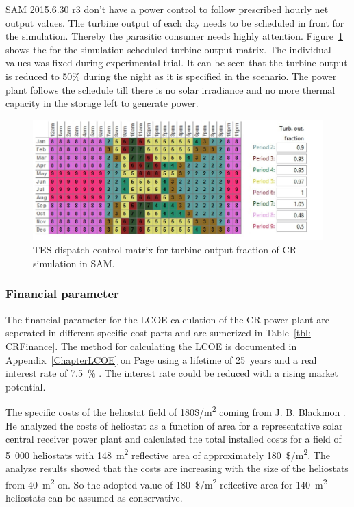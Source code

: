 SAM 2015.6.30 r3 don't have a power control to follow prescribed hourly net output values. The turbine output of each day needs to be scheduled in front for the simulation. Thereby the parasitic consumer needs highly attention. Figure~\ref{CR_turbineoutput} shows the for the simulation scheduled turbine output matrix. The individual values was fixed during experimental trial. It can be seen that the turbine output is reduced to 50\% during the night as it is specified in the scenario. The power plant follows the schedule till there is no solar irradiance and no more thermal capacity in the storage left to generate power. 
\begin{figure}[htbp]  
\centering
\includegraphics[width=0.95\linewidth]{FIG/CR_turbineoutput}
\caption[TES dispatch control matrix for turbine output fraction of CR simulation in SAM.]{TES dispatch control matrix for turbine output fraction of CR simulation in SAM.}\label{CR_turbineoutput}
\end{figure}
\pagebreak
\subsubsection{Financial parameter}
The financial parameter for the LCOE calculation of the CR power plant are seperated in different specific cost parts and are sumerized in Table~\ref{tbl: CRFinance}. The method for calculating the LCOE is documented in Appendix~\ref{ChapterLCOE} on Page \pageref{ChapterLCOE} using a lifetime of 25~years and a real interest rate of 7.5~\% \cite{FraunhoferISE2013}. The interest rate could be reduced with a rising market potential.



The specific costs of the heliostat field of 180\$/m\textsuperscript{2} coming from J. B. Blackmon \cite{Blackmon2012}. He analyzed the costs of heliostat as a function of area for a representative solar central receiver power plant and calculated the total installed costs for a field of 5~000 heliostats with 148~m\textsuperscript{2} reflective area of approximately 180~\$/m\textsuperscript{2}. The analyze results showed that the costs are increasing with the size of the heliostats from 40~m\textsuperscript{2} on. So the adopted value of 180~\$/m\textsuperscript{2} reflective area for 140~m\textsuperscript{2} heliostats can be assumed as conservative.

